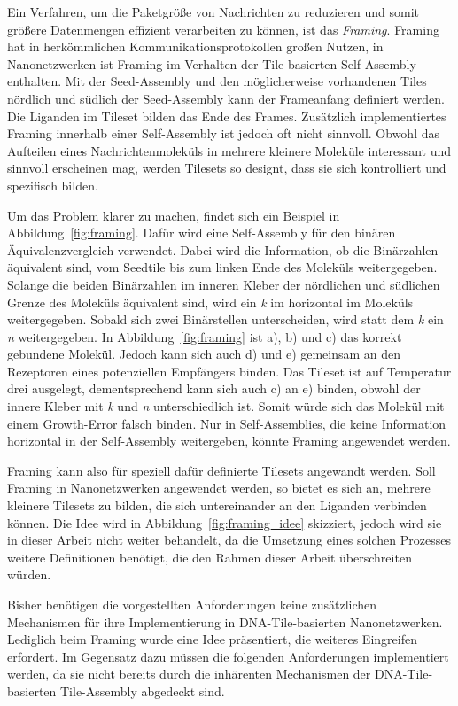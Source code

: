 Ein Verfahren, um die Paketgröße von Nachrichten zu reduzieren und somit größere Datenmengen effizient verarbeiten zu können, ist das \emph{Framing}. Framing hat in herkömmlichen Kommunikationsprotokollen großen Nutzen, in Nanonetzwerken ist Framing im Verhalten der Tile-basierten Self-Assembly enthalten. Mit der Seed-Assembly und den möglicherweise vorhandenen Tiles nördlich und südlich der Seed-Assembly kann der Frameanfang definiert werden. Die Liganden im Tileset bilden das Ende des Frames. Zusätzlich implementiertes Framing innerhalb einer Self-Assembly ist jedoch oft nicht sinnvoll. Obwohl das Aufteilen eines Nachrichtenmoleküls in mehrere kleinere Moleküle interessant und sinnvoll erscheinen mag, werden Tilesets so designt, dass sie sich kontrolliert und spezifisch bilden.

Um das Problem klarer zu machen, findet sich ein Beispiel in Abbildung~\ref{fig:framing}. Dafür wird eine Self-Assembly für den binären Äquivalenzvergleich verwendet. Dabei wird die Information, ob die Binärzahlen äquivalent sind, vom Seedtile bis zum linken Ende des Moleküls weitergegeben. Solange die beiden Binärzahlen im inneren Kleber der nördlichen und südlichen Grenze des Moleküls äquivalent sind, wird ein \emph{k} im horizontal im Moleküls weitergegeben. Sobald sich zwei Binärstellen unterscheiden, wird statt dem \emph{k} ein \emph{n} weitergegeben. In Abbildung~\ref{fig:framing} ist a), b) und c) das korrekt gebundene Molekül. Jedoch kann sich auch d) und e) gemeinsam an den Rezeptoren eines potenziellen Empfängers binden. Das Tileset ist auf Temperatur drei ausgelegt, dementsprechend kann sich auch c) an e) binden, obwohl der innere Kleber mit \emph{k} und \emph{n} unterschiedlich ist. Somit würde sich das Molekül mit einem Growth-Error falsch binden. Nur in Self-Assemblies, die keine Information horizontal in der Self-Assembly weitergeben, könnte Framing angewendet werden.

Framing kann also für speziell dafür definierte Tilesets angewandt werden. Soll Framing in Nanonetzwerken angewendet werden, so bietet es sich an, mehrere kleinere Tilesets zu bilden, die sich untereinander an den Liganden verbinden können. Die Idee wird in Abbildung~\ref{fig:framing_idee} skizziert, jedoch wird sie in dieser Arbeit nicht weiter behandelt, da die Umsetzung eines solchen Prozesses weitere Definitionen benötigt, die den Rahmen dieser Arbeit überschreiten würden. 

Bisher benötigen die vorgestellten Anforderungen keine zusätzlichen Mechanismen für ihre Implementierung in DNA-Tile-basierten Nanonetzwerken. Lediglich beim Framing wurde eine Idee präsentiert, die weiteres Eingreifen erfordert. Im Gegensatz dazu müssen die folgenden Anforderungen implementiert werden, da sie nicht bereits durch die inhärenten Mechanismen der DNA-Tile-basierten Tile-Assembly abgedeckt sind.

